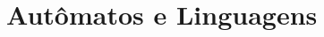 \documentclass[b5paper,10pt]{book}
\begin{document}
	\part{Autômatos e Linguagens}
	
	

\end{document}
